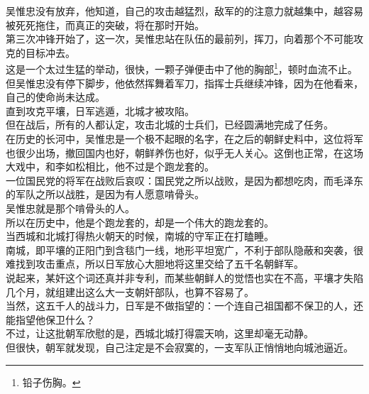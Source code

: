 \begin{multicols}{\theparacolNo}
吴惟忠没有放弃，他知道，自己的攻击越猛烈，敌军的的注意力就越集中，越容易被死死拖住，而真正的突破，将在那时开始。\\

第三次冲锋开始了，这一次，吴惟忠站在队伍的最前列，挥刀，向着那个不可能攻克的目标冲去。\\

这是一个太过生猛的举动，很快，一颗子弹便击中了他的胸部\footnote{铅子伤胸。}，顿时血流不止。\\

但吴惟忠没有停下脚步，他依然挥舞着军刀，指挥士兵继续冲锋，因为在他看来，自己的使命尚未达成。\\

直到攻克平壤，日军逃遁，北城才被攻陷。\\

但在战后，所有的人都认定，攻击北城的士兵们，已经圆满地完成了任务。\\

在历史的长河中，吴惟忠是一个极不起眼的名字，在之后的朝鲜史料中，这位将军也很少出场，撤回国内也好，朝鲜养伤也好，似乎无人关心。这倒也正常，在这场大戏中，和李如松相比，他不过是个跑龙套的。\\

一位国民党的将军在战败后哀叹：国民党之所以战败，是因为都想吃肉，而毛泽东的军队之所以战胜，是因为有人愿意啃骨头。\\

吴惟忠就是那个啃骨头的人。\\

所以在历史中，他是个跑龙套的，却是一个伟大的跑龙套的。\\

当西城和北城打得热火朝天的时候，南城的守军正在打瞌睡。\\

南城，即平壤的正阳门到含毯门一线，地形平坦宽广，不利于部队隐蔽和突袭，很难找到攻击重点，所以日军放心大胆地将这里交给了五千名朝鲜军。\\

说起来，某奸这个词还真并非专利，而某些朝鲜人的觉悟也实在不高，平壤才失陷几个月，就组建出这么大一支朝奸部队，也算不容易了。\\

当然，这五千人的战斗力，日军是不做指望的：一个连自己祖国都不保卫的人，还能指望他保卫什么？\\

不过，让这批朝军欣慰的是，西城北城打得震天响，这里却毫无动静。\\

但很快，朝军就发现，自己注定是不会寂寞的，一支军队正悄悄地向城池逼近。\\


\end{multicols}
